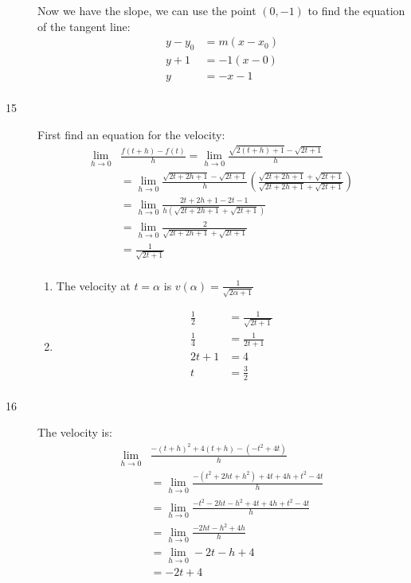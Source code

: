 \documentclass{exam}
\begin{document}
\begin{description}
Now we have the slope, we can use the point $(0, -1)$ to find the equation of the tangent line:
\begin{align*}
  y - y_0 &= m(x - x_0) \\
  y + 1   &= -1(x - 0) \\
  y       &= -x - 1 \\
\end{align*}

\item[15]
First find an equation for the velocity:
\begin{align*}
  \lim_{h \to 0} &\frac{f(t+h) - f(t)}{h} = \lim_{h \to 0} \frac{\sqrt{2(t + h) + 1} - \sqrt{2t + 1}}{h} \\
  &= \lim_{h \to 0} \frac{\sqrt{2t + 2h + 1} - \sqrt{2t + 1}}{h} \left( \frac{\sqrt{2t + 2h + 1} + \sqrt{2t + 1}}{\sqrt{2t + 2h + 1} + \sqrt{2t + 1}} \right) \\
  &= \lim_{h \to 0} \frac{2t + 2h + 1 - 2t - 1}{h(\sqrt{2t + 2h + 1} + \sqrt{2t + 1})} \\
  &= \lim_{h \to 0} \frac{2}{\sqrt{2t + 2h + 1} + \sqrt{2t + 1}} \\
  &= \frac{1}{\sqrt{2t + 1}} \\
\end{align*}

\begin{enumerate}[a]
\item
The velocity at $t = \alpha$ is $v(\alpha) = \frac{1}{\sqrt{2\alpha + 1}}$

\item
\begin{align*}
  \frac{1}{2} &= \frac{1}{\sqrt{2t + 1}} \\
  \frac{1}{4} &= \frac{1}{2t + 1} \\
  2t + 1 &= 4 \\
  t &= \frac{3}{2} \\     
\end{align*}

\end{enumerate}

\item[16]

The velocity is:
\begin{align*}
  \lim_{h \to 0} &\frac{-(t+h)^2 + 4(t+h) - (-t^2 + 4t)}{h} \\
   &= \lim_{h \to 0} \frac{-(t^2 + 2ht + h^2) + 4t+ 4h + t^2 - 4t}{h} \\
   &= \lim_{h \to 0} \frac{-t^2 - 2ht - h^2 + 4t+ 4h + t^2 - 4t}{h} \\
   &= \lim_{h \to 0} \frac{ - 2ht - h^2 + 4h}{h} \\
   &= \lim_{h \to 0}  -2t - h + 4 \\
   &= -2t + 4 \\
\end{align*}


\end{description}
\end{document}
